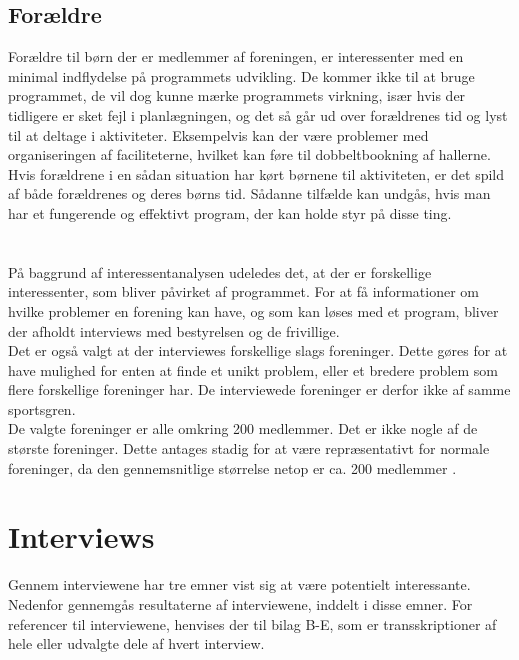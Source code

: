 \subsection*{Forældre}
Forældre til børn der er medlemmer af foreningen, er interessenter med en minimal indflydelse på programmets udvikling. De kommer ikke til at bruge programmet, de vil dog kunne mærke programmets virkning, især hvis der tidligere er sket fejl i planlægningen, og det så går ud over forældrenes tid og lyst til at deltage i aktiviteter. Eksempelvis kan der være problemer med organiseringen af faciliteterne, hvilket kan føre til dobbeltbookning af hallerne. Hvis forældrene i en sådan situation har kørt børnene til aktiviteten, er det spild af både forældrenes og deres børns tid. Sådanne tilfælde kan undgås, hvis man har et fungerende og effektivt program, der kan holde styr på disse ting.
\\\\\\
På baggrund af interessentanalysen udeledes det, at der er forskellige interessenter, som bliver påvirket af programmet. For at få informationer om hvilke problemer en forening kan have, og som kan løses med et program, bliver der afholdt interviews med bestyrelsen og de frivillige. \\
Det er også valgt at der interviewes forskellige slags foreninger. Dette gøres for at have mulighed for enten at finde et unikt problem, eller et bredere problem som flere forskellige foreninger har. De interviewede foreninger er derfor ikke af samme sportsgren.\\
De valgte foreninger er alle omkring 200 medlemmer. Det er ikke nogle af de største foreninger. Dette antages stadig for at være repræsentativt for normale foreninger, da den gennemsnitlige størrelse netop er ca. 200 medlemmer \cite{idraetTal2017}.

\section{Interviews}
Gennem interviewene har tre emner vist sig at være potentielt interessante. Nedenfor gennemgås resultaterne af interviewene, inddelt i disse emner. For referencer til interviewene, henvises der til bilag B-E, som er transskriptioner af hele eller udvalgte dele af hvert interview.

